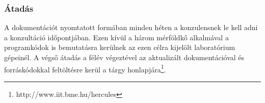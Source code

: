     \subsubsection{Átadás}
	A dokumentációt nyomtatott formában minden héten a konzulensnek le kell adni a konzultáció időpontjában. Ezen kívül a három mérföldkő alkalmával a programkódok is bemutatásra kerülnek az ezen célra kijelölt laboratórium gépeinél. A végső átadás a félév végeztével az aktualizált dokumentációval és forráskódokkal feltöltésre kerül a tárgy honlapjára\footnote{http://www.iit.bme.hu/hercules}.
%
%
